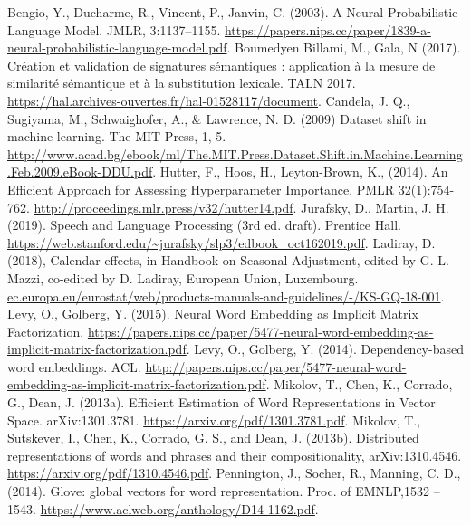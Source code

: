 \documentclass[11pt,french,french]{article}
\begin{document}
\begin{thebibliography}{999}
 Bengio, Y., Ducharme, R., Vincent, P., Janvin, C. (2003). A Neural Probabilistic Language Model. JMLR, 3:1137–1155. \url{https://papers.nips.cc/paper/1839-a-neural-probabilistic-language-model.pdf}.
 Boumedyen Billami, M.,  Gala, N (2017). Création et validation de signatures sémantiques : application à la mesure de similarité sémantique et à la substitution lexicale. TALN 2017. \url{https://hal.archives-ouvertes.fr/hal-01528117/document}.
 Candela, J. Q., Sugiyama, M., Schwaighofer, A., \& Lawrence, N. D. (2009) Dataset shift in machine learning. The MIT Press, 1, 5. \url{http://www.acad.bg/ebook/ml/The.MIT.Press.Dataset.Shift.in.Machine.Learning.Feb.2009.eBook-DDU.pdf}.
 Hutter, F., Hoos, H., Leyton-Brown, K., (2014). An Efficient Approach for Assessing Hyperparameter Importance. PMLR 32(1):754-762. \url{http://proceedings.mlr.press/v32/hutter14.pdf}.
 Jurafsky, D., Martin, J. H. (2019). Speech and Language Processing (3rd ed. draft). Prentice Hall. \url{https://web.stanford.edu/~jurafsky/slp3/edbook_oct162019.pdf}.
 Ladiray, D. (2018), Calendar effects, in Handbook on Seasonal Adjustment, edited by G. L. Mazzi, co-edited by D. Ladiray, European Union, Luxembourg. \url{ec.europa.eu/eurostat/web/products-manuals-and-guidelines/-/KS-GQ-18-001}.
 Levy, O., Golberg, Y. (2015). Neural Word Embedding as Implicit Matrix Factorization.
\url{https://papers.nips.cc/paper/5477-neural-word-embedding-as-implicit-matrix-factorization.pdf}.
 Levy, O., Golberg, Y. (2014). Dependency-based word embeddings. ACL. \url{http://papers.nips.cc/paper/5477-neural-word-embedding-as-implicit-matrix-factorization.pdf}.
 Mikolov, T.,  Chen, K., Corrado, G., Dean, J. (2013a). Efficient Estimation of Word Representations in Vector Space. arXiv:1301.3781. \url{https://arxiv.org/pdf/1301.3781.pdf}.
 Mikolov, T., Sutskever, I., Chen, K., Corrado, G. S., and Dean, J. (2013b). Distributed representations of words and phrases and their compositionality, arXiv:1310.4546. \url{https://arxiv.org/pdf/1310.4546.pdf}.
 Pennington, J., Socher, R., Manning, C. D., (2014).  Glove: global vectors for word representation. Proc. of EMNLP,1532 – 1543. \url{https://www.aclweb.org/anthology/D14-1162.pdf}.

\end{thebibliography}
\end{document}

